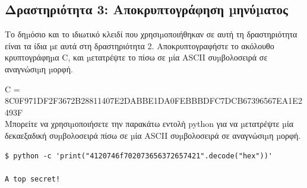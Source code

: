 \subsection{Δραστηριότητα 3: Αποκρυπτογράφηση µηνύµατος}
\noindent
Το δηµόσιο και το ιδιωτικό κλειδί που χρησιµοποιήθηκαν σε αυτή τη δραστηριότητα είναι τα
ίδια µε αυτά στη δραστηριότητα 2. Αποκρυπτογραφήστε το ακόλουθο κρυπτογράφηµα C, και
µετατρέψτε το πίσω σε µία ASCII συµβολοσειρά σε αναγνώσιµη µορφή.

\normalsize C = \small 8C0F971DF2F3672B28811407E2DABBE1DA0FEBBBDFC7DCB67396567EA1E2493F\\

\noindent
Μπορείτε να χρησιµοποιήσετε την παρακάτω εντολή python για να µετατρέψτε µία
δεκαεξαδική συµβολοσειρά πίσω σε µία ASCII συµβολοσειρά σε αναγνώσιµη µορφή.
\begin{lstlisting}	
$ python -c 'print("4120746f702073656372657421".decode("hex"))'

A top secret!
\end{lstlisting}

